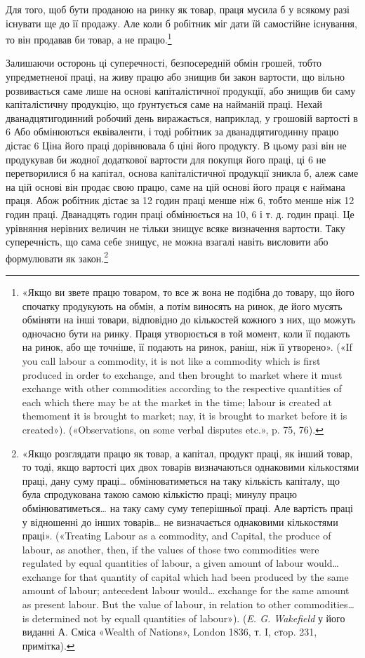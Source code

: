 Для того, щоб бути проданою на ринку як товар, праця мусила
б у всякому разі існувати ще до її продажу. Але коли б
робітник міг дати їй самостійне існування, то він продавав би
товар, а не працю.\footnote{
«Якщо ви звете працю товаром, то все ж вона не подібна до товару,
що його спочатку продукують на обмін, а потім виносять на ринок, де
його мусять обміняти на інші товари, відповідно до кількостей кожного
з них, що можуть одночасно бути на ринку. Праця утворюється в той
момент, коли її подають на ринок, або ще точніше, її подають на ринок,
раніш, ніж її утворено». («If you call labour a commodity, it is not like a
commodity which is first produced in order to exchange, and then brought
to market where it must exchange with other commodities according to the
respective quantities of each which there may be at the market in the
time; labour is created at themoment it is brought to market; nay, it is
brought to market before it is created»). («Observations, on some verbal
disputes etc.», p. 75, 76).
}

Залишаючи осторонь ці суперечності, безпосередній обмін грошей,
тобто упредметненої праці, на живу працю або знищив би
закон вартости, що вільно розвивається саме лише на основі
капіталістичної продукції, або знищив би саму капіталістичну
продукцію, що ґрунтується саме на найманій праці. Нехай дванадцятигодинний
робочий день виражається, наприклад, у грошовій
вартості в 6 Або обмінюються еквіваленти, і тоді
робітник за дванадцятигодинну працю дістає 6 Ціна
його праці дорівнювала б ціні його продукту. В цьому разі він
не продукував би жодної додаткової вартости для покупця його
праці, ці 6 не перетворилися б на капітал, основа капіталістичної
продукції зникла б, алеж саме на цій основі він
продає свою працю, саме на цій основі його праця є наймана
праця. Абож робітник дістає за 12 годин праці менше ніж 6,
тобто менше ніж 12 годин праці. Дванадцять годин праці
обмінюється на 10, 6 і т. д. годин праці. Це урівняння нерівних
величин не тільки знищує всяке визначення вартости. Таку
суперечність, що сама себе знищує, не можна взагалі навіть висловити
або формулювати як закон.\footnote{
«Якщо розглядати працю як товар, а капітал, продукт праці,
як інший товар, то тоді, якщо вартості цих двох товарів визначаються
однаковими кількостями праці, дану суму праці\dots{} обмінюватиметься
на таку кількість капіталу, що була спродукована такою самою кількістю
праці; минулу працю обмінюватиметься\dots{} на таку саму суму теперішньої
праці. Але вартість праці у відношенні до інших товарів\dots{} не визначається
однаковими кількостями праці». («Treating Labour as a commodity,
and Capital, the produce of labour, as another, then, if the values
of those two commodities were regulated by equal quantities of labour,
a given amount of labour would\dots{} exchange for that quantity of capital
which had been produced by the same amount of labour; antecedent labour
would\dots{} exchange for the same amount as present labour. But the value
of labour, in relation to other commodities\dots{} is determined not by equall
quantities of labour»). (\emph{E. G. Wakefield} у його виданні А. Сміса «Wealth
of Nations», London 1836, т. I, cтop. 231, примітка).
}
